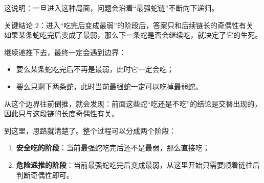\documentclass{book}
\begin{document}
这说明：一旦进入这种局面，问题会沿着“最强蛇链”不断向下递归。

\begin{keybox}{关键结论 2：进入“吃完后变成最弱”的阶段后，答案只和后续链长的奇偶性有关}
如果某条蛇吃完后变成了最弱，那么下一条蛇是否会继续吃，就决定了它的生死。

继续递推下去，最终一定会遇到边界：

\begin{itemize}[leftmargin=2em,itemsep=1pt,topsep=2pt,parsep=0pt,partopsep=0pt]
    \item 要么某条蛇吃完后不再是最弱，此时它一定会吃；
    \item 要么只剩下两条蛇，此时当前最强蛇一定可以吃掉最弱蛇。
\end{itemize}

从这个边界往前倒推，就会发现：前面这些蛇“吃还是不吃”的结论是交替出现的，因此只与这段链的长度奇偶性有关。
\end{keybox}

到这里，思路就清楚了。整个过程可以分成两个阶段：

\begin{enumerate}[leftmargin=2em,itemsep=1pt,topsep=2pt,parsep=0pt,partopsep=0pt]
    \item \textbf{安全吃的阶段}：当前最强蛇吃完后还不是最弱，那么直接吃；
    \item \textbf{危险递推的阶段}：当前最强蛇吃完后变成最弱，从这里开始只需要顺着链往后判断奇偶性即可。
\end{enumerate}
\end{document}
